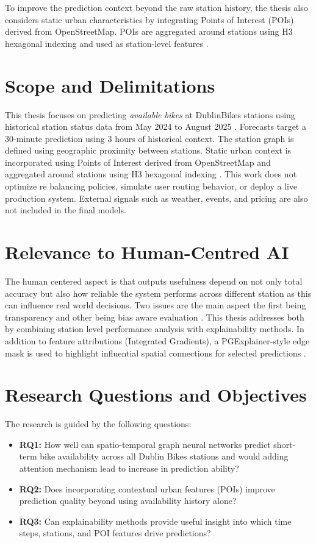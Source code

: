 \documentclass[11pt]{report}
\begin{document}
To improve the prediction context beyond the raw station history, the thesis also considers static urban characteristics by integrating Points of Interest (POIs) derived from OpenStreetMap. POIs are aggregated around stations using H3 hexagonal indexing and used as station-level features \cite{osm_copyright,h3_docs}.


\section{Scope and Delimitations}
This thesis focuses on predicting \textit{available bikes} at DublinBikes stations using historical station status data from May 2024 to August 2025 \cite{smartdublin_dublinbikes_api}. Forecasts target a 30-minute prediction using 3 hours of historical context. The station graph is defined using geographic proximity between stations. Static urban context is incorporated using Points of Interest derived from OpenStreetMap and aggregated around stations using H3 hexagonal indexing \cite{osm_copyright,h3_docs}. This work does not optimize re balancing policies, simulate user routing behavior, or deploy a live production system. External signals such as weather, events, and pricing are also not included in the final models.

\section{Relevance to Human-Centred AI}
The human centered aspect is that outputs usefulness depend on not only total accuracy but also how reliable the system performs across different station as this can influence real world decisions. Two issues are the main aspect the first being transparency and other being bias aware evaluation \cite{yan2020fairness,zheng2021equality,eu_ai_act}. This thesis addresses both by combining station level performance analysis with explainability methods. In addition to feature attributions (Integrated Gradients), a PGExplainer-style edge mask is used to highlight influential spatial connections for selected predictions \cite{luo2020pgexplainer}.


\section{Research Questions and Objectives}
The research is guided by the following questions:
\begin{itemize}
    \item \textbf{RQ1:} How well can spatio-temporal graph neural networks predict short-term bike availability across all Dublin Bikes stations and would adding attention mechanism lead to increase in prediction ability?
    \item \textbf{RQ2:} Does incorporating contextual urban features (POIs) improve prediction quality beyond using availability history alone?
    \item \textbf{RQ3:} Can explainability methods provide useful insight into which time steps, stations, and POI features drive predictions?
\end{itemize}
\end{document}
